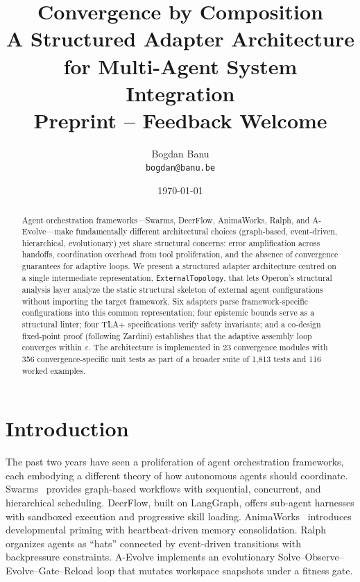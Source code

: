\documentclass[11pt]{article}
\title{\textbf{Convergence by Composition}\\
\large A Structured Adapter Architecture for Multi-Agent System Integration\\[0.5em]
\normalsize Preprint -- Feedback Welcome}
\author{Bogdan Banu\\\texttt{bogdan@banu.be}}
\date{\today}
\begin{document}
\maketitle

\begin{abstract}
Agent orchestration frameworks---Swarms, DeerFlow, AnimaWorks, Ralph, and
A-Evolve---make fundamentally different architectural choices (graph-based,
event-driven, hierarchical, evolutionary) yet share structural concerns:
error amplification across handoffs, coordination overhead from tool
proliferation, and the absence of convergence guarantees for adaptive loops.
We present a structured adapter architecture centred on a single
intermediate representation, \texttt{ExternalTopology}, that lets Operon's
structural analysis layer analyze the static structural skeleton of
external agent configurations without importing the target framework.  Six adapters parse framework-specific configurations into this
common representation; four epistemic bounds serve as a structural linter;
four TLA+ specifications verify safety invariants; and a co-design
fixed-point proof (following Zardini) establishes that the adaptive assembly
loop converges within $\varepsilon$.  The architecture is implemented in 23
convergence modules with 356 convergence-specific unit tests as part of a broader
suite of 1{,}813 tests and 116 worked examples.
\end{abstract}

\section{Introduction}

The past two years have seen a proliferation of agent orchestration
frameworks, each embodying a different theory of how autonomous agents
should coordinate.  Swarms~\cite{swarms} provides graph-based workflows
with sequential, concurrent, and hierarchical scheduling.
DeerFlow, built on LangGraph, offers sub-agent harnesses with sandboxed
execution and progressive skill loading.
AnimaWorks~\cite{animaworks} introduces developmental priming with
heartbeat-driven memory consolidation.  Ralph organizes agents as ``hats''
connected by event-driven transitions with backpressure constraints.
A-Evolve implements an evolutionary Solve--Observe--Evolve--Gate--Reload
loop that mutates workspace snapshots under a fitness gate.
\end{document}
